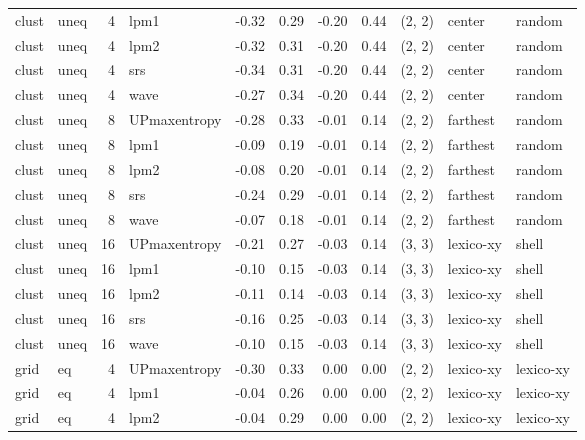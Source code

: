 \begin{tabular}{llrlrrrrlll}
 clust &  uneq &  4 &         lpm1 & -0.32 &     0.29 &  -0.20 &       0.44 & (2, 2) &      center &     random \\
 clust &  uneq &  4 &         lpm2 & -0.32 &     0.31 &  -0.20 &       0.44 & (2, 2) &      center &     random \\
 clust &  uneq &  4 &          srs & -0.34 &     0.31 &  -0.20 &       0.44 & (2, 2) &      center &     random \\
 clust &  uneq &  4 &         wave & -0.27 &     0.34 &  -0.20 &       0.44 & (2, 2) &      center &     random \\
 clust &  uneq &  8 & UPmaxentropy & -0.28 &     0.33 &  -0.01 &       0.14 & (2, 2) &    farthest &     random \\
 clust &  uneq &  8 &         lpm1 & -0.09 &     0.19 &  -0.01 &       0.14 & (2, 2) &    farthest &     random \\
 clust &  uneq &  8 &         lpm2 & -0.08 &     0.20 &  -0.01 &       0.14 & (2, 2) &    farthest &     random \\
 clust &  uneq &  8 &          srs & -0.24 &     0.29 &  -0.01 &       0.14 & (2, 2) &    farthest &     random \\
 clust &  uneq &  8 &         wave & -0.07 &     0.18 &  -0.01 &       0.14 & (2, 2) &    farthest &     random \\
 clust &  uneq & 16 & UPmaxentropy & -0.21 &     0.27 &  -0.03 &       0.14 & (3, 3) &   lexico-xy &      shell \\
 clust &  uneq & 16 &         lpm1 & -0.10 &     0.15 &  -0.03 &       0.14 & (3, 3) &   lexico-xy &      shell \\
 clust &  uneq & 16 &         lpm2 & -0.11 &     0.14 &  -0.03 &       0.14 & (3, 3) &   lexico-xy &      shell \\
 clust &  uneq & 16 &          srs & -0.16 &     0.25 &  -0.03 &       0.14 & (3, 3) &   lexico-xy &      shell \\
 clust &  uneq & 16 &         wave & -0.10 &     0.15 &  -0.03 &       0.14 & (3, 3) &   lexico-xy &      shell \\
  grid &    eq &  4 & UPmaxentropy & -0.30 &     0.33 &   0.00 &       0.00 & (2, 2) &   lexico-xy &  lexico-xy \\
  grid &    eq &  4 &         lpm1 & -0.04 &     0.26 &   0.00 &       0.00 & (2, 2) &   lexico-xy &  lexico-xy \\
  grid &    eq &  4 &         lpm2 & -0.04 &     0.29 &   0.00 &       0.00 & (2, 2) &   lexico-xy &  lexico-xy \\

\end{tabular}
